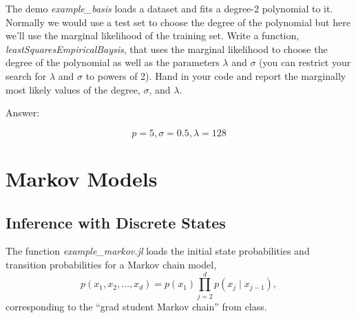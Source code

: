 \documentclass{article}
\def\ans#1{\par\gre{Answer: #1}}
\def\blu#1{{\color{blu}#1}}
\def\gre#1{{\color{gre}#1}}
\def\cond{\; | \;}
\begin{document}
The demo \emph{example\_basis} loads a dataset and fits a degree-2 polynomial to it. Normally we would use a test set to choose the degree of the polynomial but here we'll use the marginal likelihood of the training set. Write a function, \emph{leastSquaresEmpiricalBaysis}, that uses the marginal likelihood to choose the degree of the polynomial as well as the parameters $\lambda$ and $\sigma$ (you can restrict your search for $\lambda$ and $\sigma$ to powers of 2). \blu{Hand in your code and report the marginally most likely values of the degree, $\sigma$, and $\lambda$.} 
\ans{

\[p=5,\sigma=0.5,\lambda=128\]
}

\pagebreak

\section{Markov Models}

\subsection{Inference with Discrete States}

The function \emph{example\_markov.jl} loads the initial state probabilities and transition probabilities for a Markov chain model,
\[
p(x_1,x_2,\dots,x_d) = p(x_1)\prod_{j=2}^{d}{p(x_j\cond x_{j-1})},
\]
corresponding to the ``grad student Markov chain'' from class.
\end{document}
